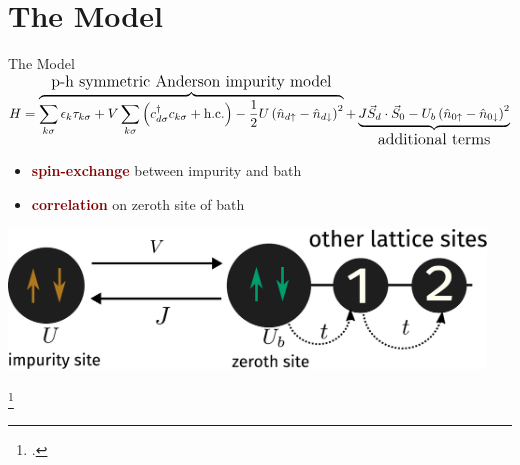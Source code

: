 \documentclass[aspectratio=169]{beamer}
\newcommand{\focus}[1]{\textcolor{maroon}{\textbf{#1}}}
\begin{document}
\section{The Model}
\label{the-model}
\begin{frame}[noframenumbering]{The Model}
\centering
	{\large\(H = \overbrace{\sum_{k\sigma}\epsilon_k \tau_{k\sigma} + V \sum_{k\sigma}\left(c^\dagger_{d\sigma}c_{k\sigma} + \text{h.c.}\right)  - \frac{1}{2}U \left(\hat n_{d \uparrow} - \hat n_{d \downarrow}\right)^2}^\text{\large p-h symmetric Anderson impurity model} + \underbrace{J \vec{S}_d\cdot\vec{S}_0 - U_b \left(\hat n_{0 \uparrow} - \hat n_{0 \downarrow}\right)^2}_\text{\large additional terms}\)}

\vspace*{\fill}
\hspace*{-25pt}
\begin{minipage}{0.39\textwidth}
\begin{itemize}
	\item \focus{spin-exchange} between impurity and bath
	\item \focus{correlation} on zeroth site of bath
\end{itemize}
\end{minipage}
\begin{minipage}{0.6\textwidth}
\hspace*{15pt}
\includegraphics[width=0.95\textwidth]{figures/zeromode_bare.pdf}
\end{minipage}

\footcite{Schrieffer_Wolff,anderson_impurity_1961}

\end{frame}
\end{document}
